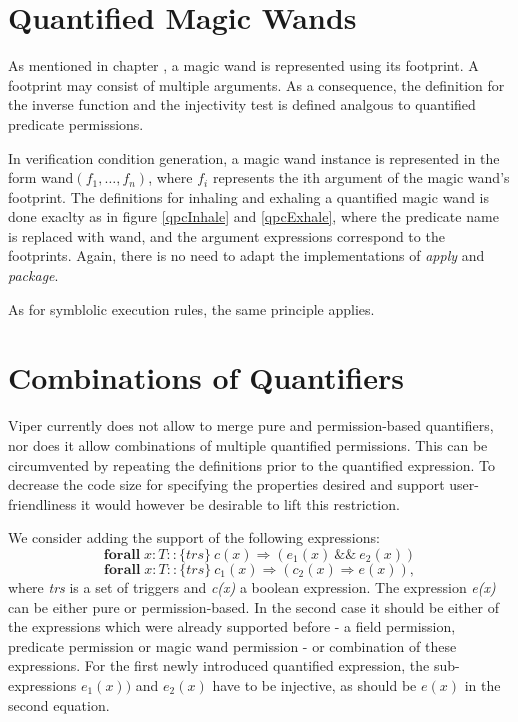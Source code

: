 \documentclass[12pt]{article}
\begin{document}
\section{Quantified Magic Wands}
As mentioned in chapter , a magic wand is represented using its footprint. A footprint may consist of multiple arguments. As a consequence, the definition for the inverse function and the injectivity test is defined analgous to quantified predicate permissions.

In verification condition generation, a magic wand instance is represented in the form wand\( (f_1, \dots, f_n) \), where \(f_i\) represents the ith argument of the magic wand's footprint. The definitions for inhaling and exhaling a quantified magic wand is done exaclty as in figure \ref{qpcInhale} and \ref{qpcExhale}, where the predicate name is replaced with wand, and the argument expressions correspond to the footprints.
Again, there is no need to adapt the implementations of \textit{apply} and \textit{package}.

As for symblolic execution rules, the same principle applies.%

\section{Combinations of Quantifiers}
Viper currently does not allow to merge pure and permission-based quantifiers, nor does it allow combinations of multiple quantified permissions. This can be circumvented by repeating the definitions prior to the quantified expression.
To decrease the code size for specifying the properties desired and support user-friendliness it would however be desirable to lift this restriction.

We consider adding the support of the following expressions:
\begin{equation}
\label{eq1}
	\mathbf{forall} \; x:T :: \{trs\}\  c(x) \Rightarrow (e_1(x)\ \&\& \ e_2(x))
\end{equation}
\begin{equation}
\label{eq2}
	\mathbf{forall} \; x:T ::  \{trs\}\ c_1(x) \Rightarrow (c_2(x) \Rightarrow e(x)),
\end{equation}
where {\it trs} is a set of triggers and {\it c(x)} a boolean expression. The expression {\it e(x)} can be either pure or permission-based. In the second case it should be either of the expressions which were already supported before - a field permission, predicate permission or magic wand permission - or combination of these expressions. For the first newly introduced quantified expression, the sub-expressions \(e_1(x))\) and \(e_2(x)\) have to be injective, as should be \( e(x)\) in the second equation.
\end{document}
